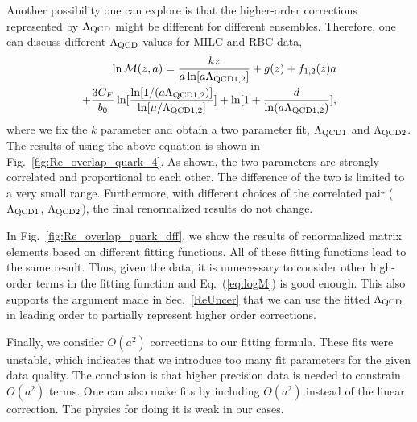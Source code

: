 Another possibility one can explore is that the higher-order corrections
represented by $\Lambda_{\rm QCD}$ might be different for different ensembles. Therefore, one can discuss different  
$\Lambda_{\rm QCD}$ values for MILC and RBC data,
\begin{align}\label{eq:logM_4}
\ln \mathcal{M}(z,a) = \frac{k z}{a \ln[a \Lambda_{\rm QCD1,2}]} + g(z) + f_{1,2} (z) a \nonumber\\
+\frac{3 C_{F}}{b_0} \ln [\frac{\ln [1 /(a \Lambda_{\rm QCD1,2})]}{\ln [\mu / \Lambda_{\rm QCD1,2}]}] + \ln [1+\frac{d}{\ln (a \Lambda_{\rm QCD1,2})}],
\end{align}
where we fix the $k$ parameter and obtain a two parameter fit, $\Lambda_{\rm QCD1}$ and $\Lambda_{\rm QCD2}$. 
The results of using the above equation is shown in Fig.~\ref{fig:Re_overlap_quark_4}. As shown, the two parameters 
are strongly correlated and proportional to each other. The difference 
of the two is limited to a very small range. Furthermore, with different
choices of the correlated pair ($\Lambda_{\rm QCD1}$, $\Lambda_{\rm QCD2}$), the final renormalized results do not change. 

In Fig.~\ref{fig:Re_overlap_quark_dff}, we show the results of renormalized matrix elements based on different fitting functions. All of these fitting functions lead to the same result. Thus, given the data, it is 
unnecessary to consider other high-order terms in the fitting function and Eq.~(\ref{eq:logM}) is good enough. This also supports the argument made in Sec.~\ref{ReUncer} that we can use the fitted $\Lambda_{\rm QCD}$ in leading order to partially represent higher order corrections.

Finally, we consider $O(a^{2})$ corrections to our fitting formula. These fits were unstable, which indicates that we introduce too many fit parameters for the given data quality. The conclusion is that higher precision data is needed to constrain $O(a^2)$ terms. One can also make fits
by including  $O(a^{2})$  instead of the linear correction. The physics for doing it is
weak in our cases.

